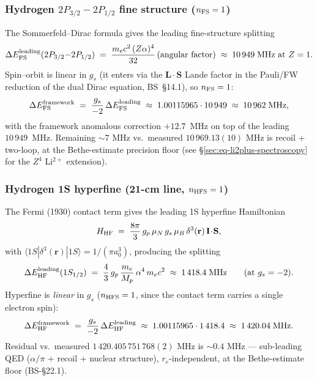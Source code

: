 \subsubsection{Hydrogen $2P_{3/2}{-}2P_{1/2}$ fine structure ($n_{\rm FS}=1$)}

The Sommerfeld--Dirac formula gives the leading fine-structure splitting
\begin{equation}
\label{eq:fs-leading}
\Delta E_{\rm FS}^{\rm leading}(2P_{3/2}{-}2P_{1/2})
\;=\; \frac{m_e c^2\,(Z\alpha)^4}{32}\,(\text{angular factor})
\;\approx\; 10\,949\;\text{MHz at }Z=1.
\end{equation}
Spin--orbit is linear in $g_s$ (it enters via the $\mathbf{L}\!\cdot\!\mathbf{S}$
Lande factor in the Pauli/FW reduction of the dual Dirac equation,
BS~\S14.1), so $n_{\rm FS} = 1$:
\begin{equation}
\Delta E_{\rm FS}^{\rm framework}
\;=\; \frac{g_s}{-2}\,\Delta E_{\rm FS}^{\rm leading}
\;\approx\; 1.00115965 \cdot 10\,949
\;\approx\; 10\,962\;\text{MHz},
\end{equation}
with the framework anomalous correction $+12.7$~MHz on top of the leading
$10\,949$~MHz. Remaining $\sim 7$ MHz vs.~measured $10\,969.13(10)$ MHz is
recoil + two-loop, at the Bethe-estimate precision floor
(see \S\ref{sec:eq-li2plus-spectroscopy} for the $Z^4$ Li$^{2+}$ extension).

\subsubsection{Hydrogen 1S hyperfine (21-cm line, $n_{\rm HFS}=1$)}

The Fermi (1930) contact term gives the leading 1S hyperfine Hamiltonian
\begin{equation}
\label{eq:hfs-fermi}
H_{\rm HF}
\;=\; \frac{8\pi}{3}\,g_p\,\mu_N\,g_s\,\mu_B\,
       \delta^3(\mathbf{r})\,\mathbf{I}\!\cdot\!\mathbf{S},
\end{equation}
with $\langle 1S | \delta^3(\mathbf{r}) | 1S \rangle = 1/(\pi a_0^3)$,
producing the splitting
\begin{equation}
\Delta E_{\rm HF}^{\rm leading}(1S_{1/2})
\;=\; \frac{4}{3}\,g_p\,\frac{m_e}{M_p}\,\alpha^4\,m_e c^2
\;\approx\; 1\,418.4\;\text{MHz}\qquad(\text{at }g_s = -2).
\end{equation}
Hyperfine is \emph{linear} in $g_s$ ($n_{\rm HFS} = 1$, since the contact
term carries a single electron spin):
\begin{equation}
\Delta E_{\rm HF}^{\rm framework}
\;=\; \frac{g_s}{-2}\,\Delta E_{\rm HF}^{\rm leading}
\;\approx\; 1.00115965\cdot 1\,418.4
\;\approx\; 1\,420.04\;\text{MHz}.
\end{equation}
Residual vs.~measured $1\,420.405\,751\,768(2)$ MHz is $\sim 0.4$ MHz ---
sub-leading QED ($\alpha/\pi$ + recoil + nuclear structure),
$r_e$-independent, at the Bethe-estimate floor (BS-\S22.1).

